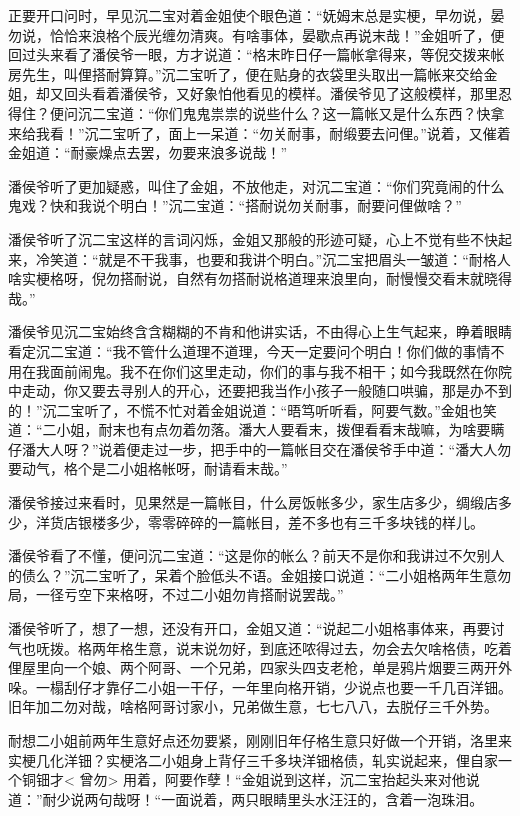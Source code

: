 \documentclass[12pt,UTF8]{ctexbook}
\begin{document}
{{{正要开口问时，早见沉二宝对着金姐使个眼色道：“妩姆末总是实梗，早勿说，晏勿说，恰恰来浪格个辰光缠勿清爽。有啥事体，晏歇点再说末哉！”金姐听了，便回过头来看了潘侯爷一眼，方才说道：“格末昨日仔一篇帐拿得来，等倪交拨来帐房先生，叫俚搭耐算算。”沉二宝听了，便在贴身的衣袋里头取出一篇帐来交给金姐，却又回头看着潘侯爷，又好象怕他看见的模样。潘侯爷见了这般模样，那里忍得住？便问沉二宝道：“你们鬼鬼祟祟的说些什么？这一篇帐又是什么东西？快拿来给我看！”沉二宝听了，面上一呆道：“勿关耐事，耐缎要去问俚。”说着，又催着金姐道：“耐豪燥点去罢，勿要来浪多说哉！”

潘侯爷听了更加疑惑，叫住了金姐，不放他走，对沉二宝道：“你们究竟闹的什么鬼戏？快和我说个明白！”沉二宝道：“搭耐说勿关耐事，耐要问俚做啥？”

潘侯爷听了沉二宝这样的言词闪烁，金姐又那般的形迹可疑，心上不觉有些不快起来，冷笑道：“就是不干我事，也要和我讲个明白。”沉二宝把眉头一皱道：“耐格人啥实梗格呀，倪勿搭耐说，自然有勿搭耐说格道理来浪里向，耐慢慢交看末就晓得哉。”

潘侯爷见沉二宝始终含含糊糊的不肯和他讲实话，不由得心上生气起来，睁着眼睛看定沉二宝道：“我不管什么道理不道理，今天一定要问个明白！你们做的事情不用在我面前闹鬼。我不在你们这里走动，你们的事与我不相干；如今我既然在你院中走动，你又要去寻别人的开心，还要把我当作小孩子一般随口哄骗，那是办不到的！”沉二宝听了，不慌不忙对着金姐说道：“晤笃听听看，阿要气数。”金姐也笑道：“二小姐，耐末也有点勿着勿落。潘大人要看末，拨俚看看末哉嘛，为啥要瞒仔潘大人呀？”说着便走过一步，把手中的一篇帐目交在潘侯爷手中道：“潘大人勿要动气，格个是二小姐格帐呀，耐请看末哉。”

潘侯爷接过来看时，见果然是一篇帐目，什么房饭帐多少，家生店多少，绸缎店多少，洋货店银楼多少，零零碎碎的一篇帐目，差不多也有三千多块钱的样儿。

潘侯爷看了不懂，便问沉二宝道：“这是你的帐么？前天不是你和我讲过不欠别人的债么？”沉二宝听了，呆着个脸低头不语。金姐接口说道：“二小姐格两年生意勿局，一径亏空下来格呀，不过二小姐勿肯搭耐说罢哉。”

潘侯爷听了，想了一想，还没有开口，金姐又道：“说起二小姐格事体来，再要讨气也呒拨。格两年格生意，说末说勿好，到底还哝得过去，勿会去欠啥格债，吃着俚屋里向一个娘、两个阿哥、一个兄弟，四家头四支老枪，单是鸦片烟要三两开外哚。一榻刮仔才靠仔二小姐一干仔，一年里向格开销，少说点也要一千几百洋钿。旧年加二勿对哉，啥格阿哥讨家小，兄弟做生意，七七八八，去脱仔三千外势。

耐想二小姐前两年生意好点还勿要紧，刚刚旧年仔格生意只好做一个开销，洛里来实梗几化洋钿？实梗洛二小姐身上背仔三千多块洋钿格债，轧实说起来，俚自家一个铜钿才< 曾勿> 用着，阿要作孽！“金姐说到这样，沉二宝抬起头来对他说道：”耐少说两句哉呀！“一面说着，两只眼睛里头水汪汪的，含着一泡珠泪。

}}}
\end{document}
